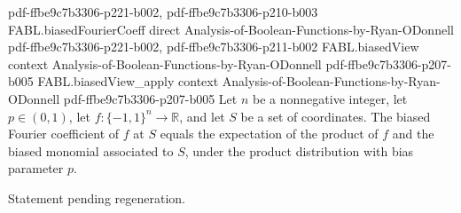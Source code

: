 \begin{theorem}
  {pdf-ffbe9c7b3306-p221-b002,
    pdf-ffbe9c7b3306-p210-b003}
\proofstep
  {FABL.biasedFourierCoeff}
  {direct}
  {Analysis-of-Boolean-Functions-by-Ryan-ODonnell}
  {pdf-ffbe9c7b3306-p221-b002,
    pdf-ffbe9c7b3306-p211-b002}
\proofstep
  {FABL.biasedView}
  {context}
  {Analysis-of-Boolean-Functions-by-Ryan-ODonnell}
  {pdf-ffbe9c7b3306-p207-b005}
\proofstep
  {FABL.biasedView_apply}
  {context}
  {Analysis-of-Boolean-Functions-by-Ryan-ODonnell}
  {pdf-ffbe9c7b3306-p207-b005}
Let $n$ be a nonnegative integer, let $p\in(0,1)$, let $f:\{-1,1\}^n\to\mathbb R$, and
let $S$ be a set of coordinates. The biased Fourier coefficient of $f$ at $S$ equals the
expectation of the product of $f$ and the biased monomial associated to $S$, under the
product distribution with bias parameter $p$.
\end{theorem}

\begin{theorem}
\label{FABL.biased_fourier_expansion}
\leanok
{}
Statement pending regeneration.
\end{theorem}

